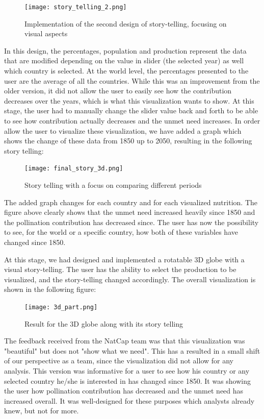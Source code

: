 \documentclass[12pt]{article}
\begin{document}
\begin{figure}[!ht]
\centering
\texttt{[image: story\_telling\_2.png]}
\caption{Implementation of the second design of story-telling, focusing on visual aspects}
\end{figure} \newpage
In this design, the percentages, population and production represent the data that are modified depending on the value in slider (the selected year) as well which country is selected. At the world level, the percentages presented to the user are the average of all the countries. \newline
While this was an improvement from the older version, it did not allow the user to easily see how the contribution decreases over the years, which is what this visualization wants to show. At this stage, the user had to manually change the slider value back and forth to be able to see how contribution actually decreases and the unmet need increases. \newline
In order allow the user to visualize these visualization, we have added a graph which shows the change of these data from 1850 up to 2050, resulting in the following story telling:
\begin{figure}[!ht]
\centering
\texttt{[image: final\_story\_3d.png]}
\caption{Story telling with a focus on comparing different periods}
\end{figure} \newline
The added graph changes for each country and for each visualized nutrition. The figure above clearly shows that the unmet need increased heavily since 1850 and the pollination contribution has decreased since. The user has now the possibility to see, for the world or a specific country, how both of these variables have changed since 1850. \newline

At this stage, we had designed and implemented a rotatable 3D globe with a visual story-telling. The user has the ability to select the production to be visualized, and the story-telling changed accordingly. The overall visualization is shown in the following figure:
\begin{figure}[h]
\centering
\texttt{[image: 3d\_part.png]}
\caption{Result for the 3D globe along with its story telling}
\end{figure} 
The feedback received from the NatCap team was that this visualization was "beautiful" but does not "show what we need". This has a resulted in a small shift of our perspective as a team, since the visualization did not allow for any analysis. This version was informative for a user to see how his country or any selected country he/she is interested in has changed since 1850. It was showing the user how pollination contribution has decreased and the unmet need has increased overall. It was well-designed for these purposes which analysts already knew, but not for more. 
\end{document}
